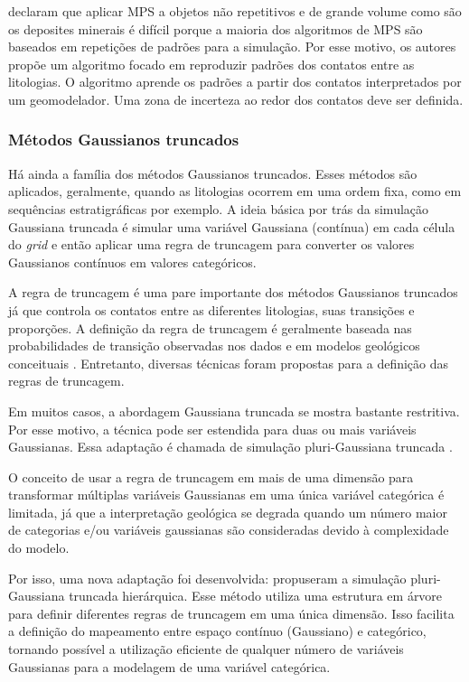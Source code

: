  declaram que aplicar MPS a objetos não repetitivos e de grande volume como são os deposites minerais é difícil porque a maioria dos algoritmos de MPS são baseados em repetições de padrões para a simulação. Por esse motivo, os autores propõe um algoritmo focado em reproduzir padrões dos contatos entre as litologias. O algoritmo aprende os padrões a partir dos contatos interpretados por um geomodelador. Uma zona de incerteza ao redor dos contatos deve ser definida.

\subsubsection{Métodos Gaussianos truncados}

Há ainda a família dos métodos Gaussianos truncados. Esses métodos são aplicados, geralmente, quando as litologias ocorrem em uma ordem fixa, como em sequências estratigráficas por exemplo. A ideia básica por trás da simulação Gaussiana truncada \cite{matheron1987conditional} é simular uma variável Gaussiana (contínua) em cada célula do \textit{grid} e então aplicar uma regra de truncagem para converter os valores Gaussianos contínuos em valores categóricos.

A regra de truncagem é uma pare importante dos métodos Gaussianos truncados já que controla os contatos entre as diferentes litologias, suas transições e proporções. A definição da regra de truncagem é geralmente baseada nas probabilidades de transição observadas nos dados e em modelos geológicos conceituais \cite{silva2018enhanced}. Entretanto, diversas técnicas foram propostas para a definição das regras de truncagem. 

Em muitos casos, a abordagem Gaussiana truncada se mostra bastante restritiva. Por esse motivo, a técnica pode ser estendida para duas ou mais variáveis Gaussianas. Essa adaptação é chamada de simulação pluri-Gaussiana truncada \cite{armstrong2011plurigaussian}.

O conceito de usar a regra de truncagem em mais de uma dimensão para transformar múltiplas variáveis Gaussianas em uma única variável categórica é limitada, já que a interpretação geológica se degrada quando um número maior de categorias e/ou variáveis gaussianas são consideradas devido à complexidade do modelo.

Por isso, uma nova adaptação foi desenvolvida:  propuseram a simulação pluri-Gaussiana truncada hierárquica. Esse método utiliza uma estrutura em árvore para definir diferentes regras de truncagem em uma única dimensão. Isso facilita a definição do mapeamento entre espaço contínuo (Gaussiano) e categórico, tornando possível a utilização eficiente de qualquer número de variáveis Gaussianas para a modelagem de uma variável categórica.

